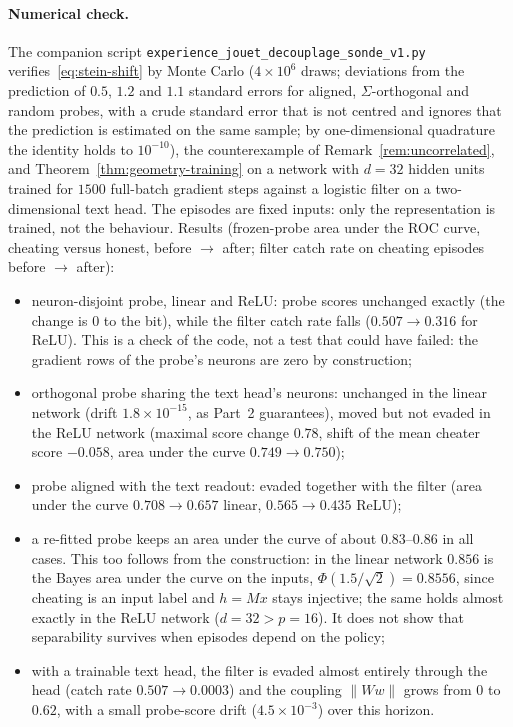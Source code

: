 \paragraph{Numerical check.} The companion script \texttt{experience\_jouet\_decouplage\_sonde\_v1.py} verifies~\eqref{eq:stein-shift} by Monte Carlo ($4 \times 10^6$ draws; deviations from the prediction of $0.5$, $1.2$ and $1.1$ standard errors for aligned, $\Sigma$-orthogonal and random probes, with a crude standard error that is not centred and ignores that the prediction is estimated on the same sample; by one-dimensional quadrature the identity holds to $10^{-10}$), the counterexample of Remark~\ref{rem:uncorrelated}, and Theorem~\ref{thm:geometry-training} on a network with $d = 32$ hidden units trained for $1500$ full-batch gradient steps against a logistic filter on a two-dimensional text head. The episodes are fixed inputs: only the representation is trained, not the behaviour. Results (frozen-probe area under the ROC curve, cheating versus honest, before $\to$ after; filter catch rate on cheating episodes before $\to$ after):
\begin{itemize}
  \item neuron-disjoint probe, linear and ReLU: probe scores unchanged exactly (the change is $0$ to the bit), while the filter catch rate falls ($0.507 \to 0.316$ for ReLU). This is a check of the code, not a test that could have failed: the gradient rows of the probe's neurons are zero by construction;
  \item orthogonal probe sharing the text head's neurons: unchanged in the linear network (drift $1.8 \times 10^{-15}$, as Part~2 guarantees), moved but not evaded in the ReLU network (maximal score change $0.78$, shift of the mean cheater score $-0.058$, area under the curve $0.749 \to 0.750$);
  \item probe aligned with the text readout: evaded together with the filter (area under the curve $0.708 \to 0.657$ linear, $0.565 \to 0.435$ ReLU);
  \item a re-fitted probe keeps an area under the curve of about $0.83$--$0.86$ in all cases. This too follows from the construction: in the linear network $0.856$ is the Bayes area under the curve on the inputs, $\Phi(1.5/\sqrt{2}) = 0.8556$, since cheating is an input label and $h = Mx$ stays injective; the same holds almost exactly in the ReLU network ($d = 32 > p = 16$). It does not show that separability survives when episodes depend on the policy;
  \item with a trainable text head, the filter is evaded almost entirely through the head (catch rate $0.507 \to 0.0003$) and the coupling $\|Ww\|$ grows from $0$ to $0.62$, with a small probe-score drift ($4.5 \times 10^{-3}$) over this horizon.
\end{itemize}
